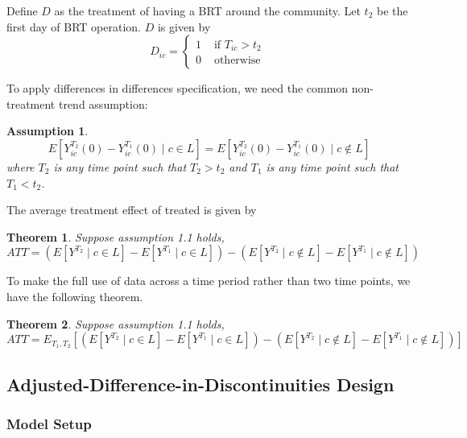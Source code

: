 \documentclass[12pt]{article}
\newtheorem{theorem}{Theorem}[section]
\newtheorem{assumption}{Assumption}[section]
\begin{document}
Define $D$ as the treatment of having a BRT around the community. Let $t_2$ be the first day of BRT operation. $D$ is given by
\begin{equation}
D_{i c}=\left\{\begin{array}{cc}
1 & \text { if }  T_{i c} > t_2 \\
0 & \text { otherwise }
\end{array}\right.
\end{equation}

To apply differences in differences specification, we need the common non-treatment trend assumption:

\begin{assumption}
\begin{equation}
    E[{Y}^{T_2}_{i c}(0) - {Y}^{T_1}_{i c}(0) \mid c \in L] = E[Y^{T_2}_{i c}(0) - {Y}^{T_1}_{i c}(0)  \mid c \not \in L]
\end{equation}
where $T_2$ is any time point such that $T_2 > t_2$ and $T_1$ is any time point such that $T_1 < t_2$.
\end{assumption}

The average treatment effect of treated is given by

\begin{theorem}
Suppose assumption 1.1 holds,
\begin{equation}
    ATT = \left( E[ {Y}^{T_2} \mid c \in L ] - E[ {Y}^{T_1} \mid c \in L ] \right) - \left( E[ {Y}^{T_2} \mid c \not \in L ] - E[ {Y}^{T_1} \mid c \not \in L ] \right)
\end{equation}
\end{theorem}

To make the full use of data across a time period rather than two time points, we have the following theorem. 

\begin{theorem}
Suppose assumption 1.1 holds,
\begin{equation}
    ATT = E_{T_1, T_2}\left[ \left( E[ {Y}^{T_2} \mid c \in L ] - E[ {Y}^{T_1} \mid c \in L ] \right) - \left( E[ {Y}^{T_2} \mid c \not \in L ] - E[ {Y}^{T_1} \mid c \not \in L ] \right) \right]
\end{equation}
\end{theorem}

\subsection{Adjusted-Difference-in-Discontinuities Design}
\subsubsection{Model Setup}
\end{document}

